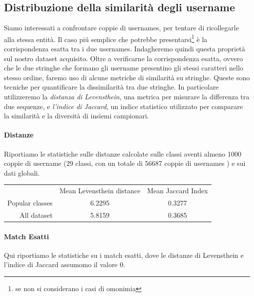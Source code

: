 \subsection{Distribuzione della similarità degli username}
Siamo interessati a confrontare coppie di usernames, per tentare di ricollegarle alla stessa entità. Il caso piú semplice che potrebbe presentarsi\footnote{se non si considerano i casi di omonimia} è la corrispondenza esatta tra i due usernames. Indagheremo quindi questa proprietà sul nostro dataset acquisito. Oltre a verificarne la corrispondenza esatta, ovvero che le due stringhe che formano gli username presentino gli stessi caratteri nello stesso ordine, faremo uso di alcune metriche di similarità su stringhe. Queste sono tecniche per quantificare la dissimilarità tra due stringhe. In particolare utilizzeremo la \textit{distanza di Levensthein}, una metrica per misurare la differenza tra due sequenze, e \textit{l'indice di Jaccard}, un indice statistico utilizzato per comparare la similarità e la diversità di insiemi campionari.

\paragraph{Distanze}
Riportiamo le statistiche sulle distanze calcolate sulle classi aventi almeno 1000 coppie di username (29 classi, con un totale di 56687 coppie di usernames ) e sui dati globali.
\newline

\begin{tabular}{ r|c|c| }
\multicolumn{1}{r}{}
 &  \multicolumn{1}{c}{Mean Levensthein distance}
 & \multicolumn{1}{c}{Mean Jaccard Index} \\
\cline{2-3}
Popular classes & 6.2295 & 0.3277\\
\cline{2-3}
All dataset & 5.8159 & 0.3685 \\
\cline{2-3}
\end{tabular}

\paragraph{Match Esatti} Qui riportiamo le statistiche su i match esatti, dove le distanze di Levensthein e l'indice di Jaccard assumomo il valore 0.
\newline

